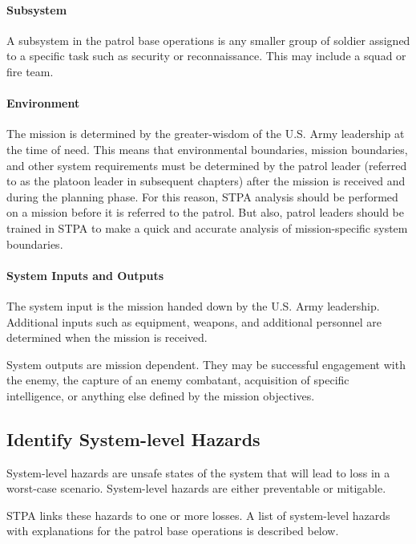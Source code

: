 \documentclass[../../main/main.tex]{subfiles}
\begin{document}
\paragraph*{Subsystem}
A subsystem in the patrol base operations is any smaller group of soldier assigned to a specific task such as security or reconnaissance.  This may include a squad or fire team.  

\paragraph*{Environment}
The mission is determined by the greater-wisdom of the U.S. Army leadership at the time of need.  This means that environmental boundaries, mission boundaries, and other system requirements must be determined by the patrol leader  (referred to as the platoon leader in subsequent chapters) after the mission is received and during the planning phase.  For this reason, STPA analysis should be performed on a mission before it is referred to the patrol.  But also, patrol leaders should be trained in STPA to make a quick and accurate analysis of mission-specific system boundaries.  


\paragraph*{System Inputs and Outputs}
The system input is the mission handed down by the U.S. Army leadership.  Additional inputs such as equipment, weapons, and additional personnel are determined when the mission is received. 

System outputs are mission dependent.  They may be successful engagement with the enemy, the capture of an enemy combatant, acquisition of specific intelligence, or anything else defined by the mission objectives.

\subsection{Identify System-level Hazards}
System-level hazards are unsafe states of the system that will lead to loss in a worst-case scenario.  System-level hazards are either preventable or mitigable.

STPA links these hazards to one or more losses.  A list of system-level hazards with explanations for the patrol base operations is described below.
\end{document}
